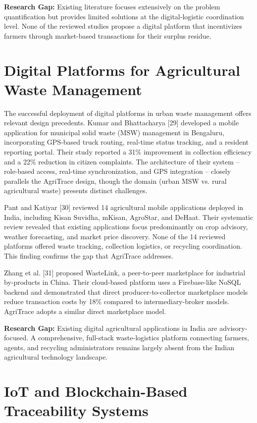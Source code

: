 \documentclass[a4paper,12pt,oneside]{report}
\begin{document}
\textbf{Research Gap:} Existing literature focuses extensively on the problem quantification but provides limited solutions at the digital-logistic coordination level. None of the reviewed studies propose a digital platform that incentivizes farmers through market-based transactions for their surplus residue.

\section{Digital Platforms for Agricultural Waste Management}

\noindent The successful deployment of digital platforms in urban waste management offers relevant design precedents. Kumar and Bhattacharya [29] developed a mobile application for municipal solid waste (MSW) management in Bengaluru, incorporating GPS-based truck routing, real-time status tracking, and a resident reporting portal. Their study reported a 31\% improvement in collection efficiency and a 22\% reduction in citizen complaints. The architecture of their system -- role-based access, real-time synchronization, and GPS integration -- closely parallels the AgriTrace design, though the domain (urban MSW vs. rural agricultural waste) presents distinct challenges.

Pant and Katiyar [30] reviewed 14 agricultural mobile applications deployed in India, including Kisan Suvidha, mKisan, AgroStar, and DeHaat. Their systematic review revealed that existing applications focus predominantly on crop advisory, weather forecasting, and market price discovery. None of the 14 reviewed platforms offered waste tracking, collection logistics, or recycling coordination. This finding confirms the gap that AgriTrace addresses.

Zhang et al. [31] proposed WasteLink, a peer-to-peer marketplace for industrial by-products in China. Their cloud-based platform uses a Firebase-like NoSQL backend and demonstrated that direct producer-to-collector marketplace models reduce transaction costs by 18\% compared to intermediary-broker models. AgriTrace adopts a similar direct marketplace model.

\textbf{Research Gap:} Existing digital agricultural applications in India are advisory-focused. A comprehensive, full-stack waste-logistics platform connecting farmers, agents, and recycling administrators remains largely absent from the Indian agricultural technology landscape.

\section{IoT and Blockchain-Based Traceability Systems}
\end{document}

